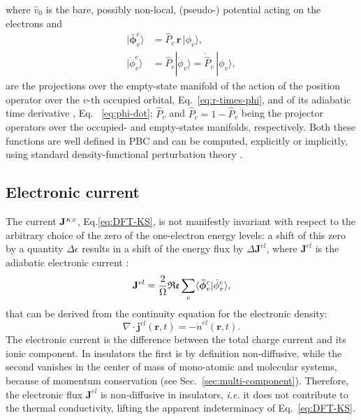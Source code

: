 where  $\hat v_0$ is the bare, possibly non-local, (pseudo-) potential acting on the electrons and
\begin{align}
  |\bm{\bar \phi}_v^c\rangle &= \hat P_c \,\mathbf{r}  \,|\phi_v \rangle, \label{eq:r-times-phi} \\
  |\dot \phi_v^c\rangle &= \hat P_c |\dot\phi_v\rangle = \dot{\hat P}_v \,|\phi_v\rangle, \label{eq:phi-dot}
\end{align}
are the projections over the empty-state manifold of the action of the position operator over the $v$-th occupied orbital, Eq.~\eqref{eq:r-times-phi}, and of its adiabatic time derivative \cite{Giannozzi2017}, Eq.~ \eqref{eq:phi-dot}; $\hat P_v$ and $\hat P_c = 1 - \hat P_v$ being the projector operators over the occupied- and empty-states manifolds, respectively. Both these functions are well defined in PBC and can be computed, explicitly or implicitly, using standard density-functional perturbation theory \cite{Baroni2001}.


\subsection{Electronic current}
\begin{LEtext}
The current $\mathbf{J}^{\scriptscriptstyle KS}$, Eq.\eqref{eq:DFT-KS}, is not manifestly invariant with respect to the arbitrary choice of the zero of the one-electron energy levels: a shift of this zero by a quantity $\Delta\epsilon$ results in a shift of the energy flux by $\Delta \mathbf{J}^{el}$, where $\mathbf{J}^{el}$ is the adiabatic electronic current \cite{Thouless1983}:
\begin{equation}
 \mathbf J^{el} = \frac{2}{\rOmega}\mathfrak{Re} \sum_{v} \langle\bm{\bar \phi}_v^c |\dot \phi_v^c \rangle, \label{eq:DFT-electronic}
\end{equation}
that can be derived from the continuity equation for the electronic density:
\begin{equation}
\nabla\cdot \bm j^{el}(\bm r,t) =- \dot{n}^{el}(\bm r,t).    
\end{equation}
The electronic current is the difference between the total charge current and its ionic component. In insulators the first is by definition non-diffusive, while the second vanishes in the center of mass of mono-atomic and molecular systems, because of momentum conservation (see Sec.~\ref{sec:multi-component}). Therefore, the electronic flux $\mathbf{J}^{el}$ is non-diffusive in insulators, \emph{i.e.} it does not contribute to the thermal conductivity, lifting the apparent indeterminacy of Eq.~\eqref{eq:DFT-KS}.
\end{LEtext}

